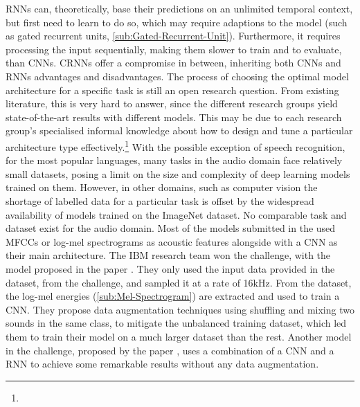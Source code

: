 \newline
\newline
\glspl{RNN} can, theoretically, base their predictions on an unlimited temporal context, but first need to learn to do so, which may require adaptions to the model (such as gated recurrent units, \ref{sub:Gated-Recurrent-Unit}). Furthermore, it requires processing the input sequentially, making them slower to train and to evaluate, than \glspl{CNN}. \Glspl{CRNN} offer a compromise in between, inheriting both \glspl{CNN} and \glspl{RNN} advantages and disadvantages.
\newline
\newline
The process of choosing the optimal model architecture for a specific task is still an open research question. From existing literature, this is very hard to answer, since the different research groups yield state-of-the-art results with different models. This may be due to each research group’s specialised informal knowledge about how to design and tune a particular architecture type effectively.\footnote{}
\newline
\newline
With the possible exception of speech recognition, for the most popular languages, many tasks in the audio domain face relatively small datasets, posing a limit on the size and complexity of deep learning models trained on them. However, in other domains, such as computer vision the shortage of labelled data for a particular task is offset by the widespread availability of models trained on the ImageNet dataset. No comparable task and dataset exist for the audio domain.
\newline
\newline
Most of the models submitted in the  used \glspl{MFCC} or log-mel spectrograms as acoustic features alongside with a \gls{CNN} as their main architecture. The IBM research team won the challenge, with the model proposed in the paper \cite{inoue_domestic_2018}. They only used the input data provided in the dataset, from the challenge, and sampled it at a rate of 16kHz. From the dataset, the log-mel energies (\ref{sub:Mel-Spectrogram}) are extracted and used to train a \gls{CNN}. They propose data augmentation techniques using shuffling and mixing two sounds in the same class, to mitigate the unbalanced training dataset, which led them to train their model on a much larger dataset than the rest.
\newline
\newline
Another model in the challenge, proposed by the paper \cite{liu_ensemble_2018}, uses a combination of a \gls{CNN} and a \gls{RNN} to achieve some remarkable results without any data augmentation. 

